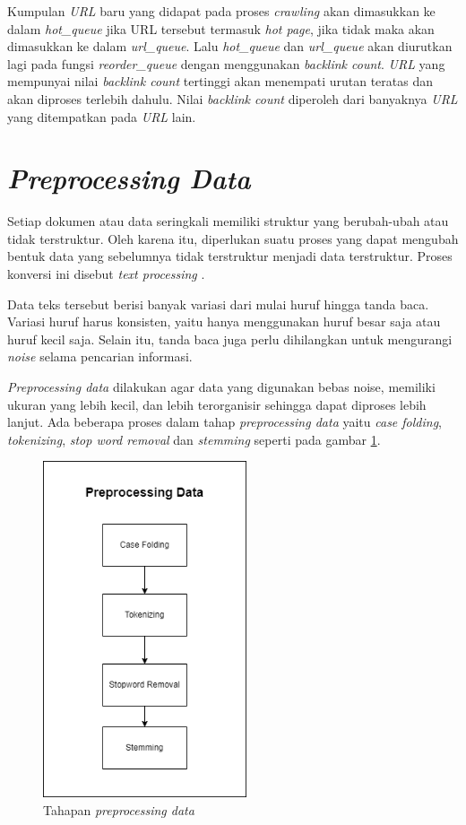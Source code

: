 Kumpulan \textit{URL} baru yang didapat pada proses \textit{crawling} akan dimasukkan ke dalam \textit{hot\_queue} jika URL tersebut termasuk \textit{hot page}, jika tidak maka akan dimasukkan ke dalam \textit{url\_queue}. Lalu \textit{hot\_queue} dan \textit{url\_queue} akan diurutkan lagi pada fungsi \textit{reorder\_queue} dengan menggunakan \textit{backlink count}. \textit{URL} yang mempunyai nilai \textit{backlink count} tertinggi akan menempati urutan teratas dan akan diproses terlebih dahulu. Nilai \textit{backlink count} diperoleh dari banyaknya \textit{URL} yang ditempatkan pada \textit{URL} lain.

\section{\emph{Preprocessing Data}}

Setiap dokumen atau data seringkali memiliki struktur yang berubah-ubah atau tidak terstruktur. Oleh karena itu, diperlukan suatu proses yang dapat mengubah bentuk data yang sebelumnya tidak terstruktur menjadi data terstruktur. Proses konversi ini disebut \textit{text processing} \citep{feldman2007the}.

Data teks tersebut berisi banyak variasi dari mulai huruf hingga tanda baca. Variasi huruf harus konsisten, yaitu hanya menggunakan huruf besar saja atau huruf kecil saja. Selain itu, tanda baca juga perlu dihilangkan untuk mengurangi \textit{noise} selama pencarian informasi.

\textit{Preprocessing data} dilakukan agar data yang digunakan bebas noise, memiliki ukuran yang lebih kecil, dan lebih terorganisir sehingga dapat diproses lebih lanjut. Ada beberapa proses dalam tahap \textit{preprocessing data} yaitu \textit{case folding}, \textit{tokenizing}, \textit{stop word removal} dan \textit{stemming} seperti pada gambar \ref{gambar:preprocessing_data}.

\begin{figure}[H]
	\centering
	\includegraphics[keepaspectratio, width=6cm]{gambar/preprocessing_data}
	\caption{Tahapan \textit{preprocessing data}}
	\label{gambar:preprocessing_data}
\end{figure}

